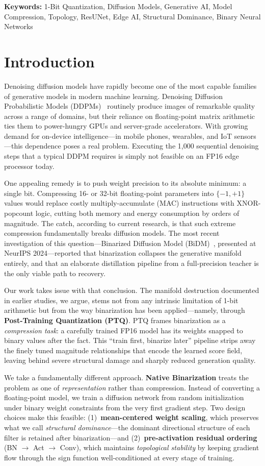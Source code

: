 \documentclass[conference]{IEEEtran}
\begin{document}
\noindent\textbf{Keywords:} 1-Bit Quantization, Diffusion Models, Generative AI, Model Compression, Topology,
ResUNet, Edge AI, Structural Dominance, Binary Neural Networks

\section{Introduction}

Denoising diffusion models have rapidly become one of the most capable families of
generative models in modern machine learning. Denoising Diffusion Probabilistic Models
(DDPMs)~\cite{ho2020ddpm} routinely produce images of remarkable quality across a range
of domains, but their reliance on floating-point matrix arithmetic ties them to
power-hungry GPUs and server-grade accelerators. With growing demand for on-device
intelligence---in mobile phones, wearables, and IoT sensors---this dependence poses a
real problem. Executing the 1{,}000 sequential denoising steps that a typical DDPM
requires is simply not feasible on an FP16 edge processor today.

One appealing remedy is to push weight precision to its absolute minimum: a single bit.
Compressing 16- or 32-bit floating-point parameters into $\{-1,+1\}$ values would
replace costly multiply-accumulate (MAC) instructions with XNOR-popcount logic, cutting
both memory and energy consumption by orders of magnitude. The catch, according to
current research, is that such extreme compression fundamentally breaks diffusion
models. The most recent investigation of this question---Binarized Diffusion Model
(BiDM)~\cite{bidm2024}, presented at NeurIPS 2024---reported that binarization
collapses the generative manifold entirely, and that an elaborate distillation pipeline
from a full-precision teacher is the only viable path to recovery.

Our work takes issue with that conclusion. The manifold destruction documented in
earlier studies, we argue, stems not from any intrinsic limitation of 1-bit
arithmetic but from the way binarization has been applied---namely, through
\textbf{Post-Training Quantization (PTQ)}. PTQ frames binarization as a
\emph{compression task}: a carefully trained FP16 model has its weights snapped to
binary values after the fact. This ``train first, binarize later'' pipeline strips
away the finely tuned magnitude relationships that encode the learned score field,
leaving behind severe structural damage and sharply reduced generation quality.

We take a fundamentally different approach.  \textbf{Native Binarization} treats the
problem as one of \emph{representation} rather than compression. Instead of converting
a floating-point model, we train a diffusion network from random initialization under
binary weight constraints from the very first gradient step. Two design choices make
this feasible: (1)~\textbf{mean-centered weight scaling}, which preserves what we call
\emph{structural dominance}---the dominant directional structure of each filter is
retained after binarization---and (2)~\textbf{pre-activation residual ordering}
(BN $\to$ Act $\to$ Conv), which maintains \emph{topological stability} by keeping
gradient flow through the sign function well-conditioned at every stage of training.
\end{document}
